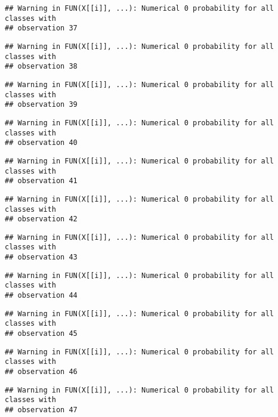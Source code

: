 \documentclass[
]{article}
\begin{document}
\begin{verbatim}
## Warning in FUN(X[[i]], ...): Numerical 0 probability for all classes with
## observation 37
\end{verbatim}

\begin{verbatim}
## Warning in FUN(X[[i]], ...): Numerical 0 probability for all classes with
## observation 38
\end{verbatim}

\begin{verbatim}
## Warning in FUN(X[[i]], ...): Numerical 0 probability for all classes with
## observation 39
\end{verbatim}

\begin{verbatim}
## Warning in FUN(X[[i]], ...): Numerical 0 probability for all classes with
## observation 40
\end{verbatim}

\begin{verbatim}
## Warning in FUN(X[[i]], ...): Numerical 0 probability for all classes with
## observation 41
\end{verbatim}

\begin{verbatim}
## Warning in FUN(X[[i]], ...): Numerical 0 probability for all classes with
## observation 42
\end{verbatim}

\begin{verbatim}
## Warning in FUN(X[[i]], ...): Numerical 0 probability for all classes with
## observation 43
\end{verbatim}

\begin{verbatim}
## Warning in FUN(X[[i]], ...): Numerical 0 probability for all classes with
## observation 44
\end{verbatim}

\begin{verbatim}
## Warning in FUN(X[[i]], ...): Numerical 0 probability for all classes with
## observation 45
\end{verbatim}

\begin{verbatim}
## Warning in FUN(X[[i]], ...): Numerical 0 probability for all classes with
## observation 46
\end{verbatim}

\begin{verbatim}
## Warning in FUN(X[[i]], ...): Numerical 0 probability for all classes with
## observation 47
\end{verbatim}
\end{document}
